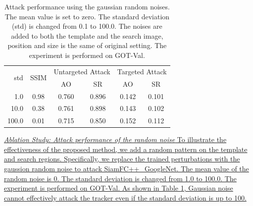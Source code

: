 \documentclass[journal]{IEEEtran}
\begin{document}
\begin{table}[t]
  \centering
  \caption{Attack performance using the gaussian random noises. The mean value is set to zero. The standard deviation (std) is changed from 0.1 to 100.0. The noises are added to both the template and the search image, position and size is the same of original setting. The experiment is performed on GOT-Val.}
  \begin{tabular}{@{}rccccc@{}}
  \toprule
  \multirow{2}{*}[-2pt]{std} & \multirow{2}{*}[-2pt]{SSIM}& \multicolumn{2}{c}{Untargeted Attack} & \multicolumn{2}{c}{Targeted Attack} \\ \cmidrule{3-6}
                             &                            & AO                & SR                & AO               & SR               \\ \midrule
  1.0                        & 0.98                       & 0.760             & 0.896             & 0.142            & 0.101            \\
  10.0                       & 0.38                       & 0.761             & 0.898             & 0.143            & 0.102            \\
  100.0                      & 0.01                       & 0.715             & 0.850             & 0.152            & 0.112            \\ \bottomrule        
  \end{tabular}
  \label{table:noise}
\end{table}
\uline{\textit{Ablation Study: Attack performance of the random noise} To illustrate the effectiveness of the proposed method, we add a random pattern on the template and search regions. 
Specifically, we replace the trained perturbations with the gaussion random noise to attack SiamFC++\_GoogleNet. The mean value of the random noise is 0. The standard deviation is changed from 1.0 to 100.0. The experiment is performed on GOT-Val.
As shown in Table \ref{table:noise}, Gaussian noise cannot effectively attack the tracker even if the standard deviation is up to 100.
}
\end{document}
